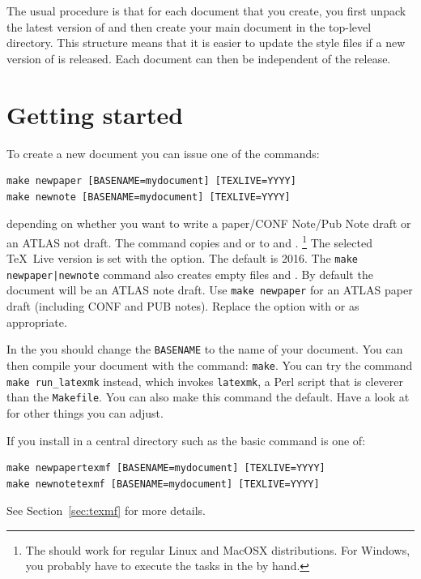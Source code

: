 The usual procedure is that for each document that you create,
you first unpack the latest version of  and
then create your main document in the top-level directory.
This structure means that it is easier to update the style files if a new version of
 is released. 
Each document can then be independent of the  release.

\section{Getting started}

To create a new document you can issue one of the commands:
%
\begin{verbatim}
make newpaper [BASENAME=mydocument] [TEXLIVE=YYYY]
make newnote [BASENAME=mydocument] [TEXLIVE=YYYY]
\end{verbatim}
depending on whether you want to write a paper/CONF Note/Pub Note draft or
an ATLAS not draft.
%
The command copies  and
 or 
to  and .%
\footnote{The  should work for regular Linux and MacOSX distributions.
For Windows, you probably have to execute the tasks in the  by hand.}
The selected \TeX\ Live version is set with the  option. The default is 2016.
The \texttt{make newpaper|newnote} command also creates empty files  and .
By default the document will be an ATLAS note draft.
Use \texttt{make newpaper} for an ATLAS paper draft (including CONF and PUB notes).
Replace the option  with  or \Option{} as appropriate.

In the  you should change the \texttt{BASENAME} to the name of your document.
You can then compile your document with the command: \texttt{make}.
You can try the command \texttt{make run\_latexmk} instead,
which invokes \texttt{latexmk}, a Perl script that is cleverer than the \texttt{Makefile}.
You can also make this command the default.
Have a look at  for other things you can adjust.

If you install  in a central directory such as  the basic command is one of:
%
\begin{verbatim}
make newpapertexmf [BASENAME=mydocument] [TEXLIVE=YYYY]
make newnotetexmf [BASENAME=mydocument] [TEXLIVE=YYYY]
\end{verbatim}
%
See Section~\ref{sec:texmf} for more details.

